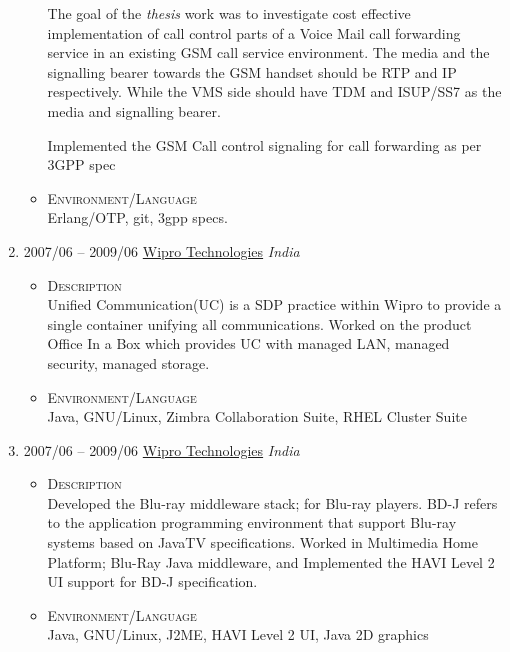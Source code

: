 \documentclass[a4paper,10pt]{article}
\begin{document}
\begin{enumerate}
\begin{itemize}
  The goal of the \emph{thesis} work was to investigate cost effective implementation of call control parts of a Voice Mail call forwarding service in an existing GSM call service environment. The media and the signalling bearer towards the GSM handset should be RTP and IP respectively. While the VMS side should have TDM and ISUP/SS7 as the media and signalling bearer.

  Implemented the GSM Call control signaling for call forwarding as per 3GPP spec

  \item \textsc{Environment/Language} \\
  Erlang/OTP, git, 3gpp specs.

   \end{itemize}

\item \textsc{2007/06} – \textsc{2009/06} \href{www.wipro.com}{Wipro Technologies} \emph {India} \\
  \begin{itemize}
    \item \textsc{Description} \\

      Unified Communication(UC) is a SDP practice within Wipro to provide a single container unifying all communications.
      Worked on the product Office In a Box which provides UC with managed LAN, managed security, managed storage.

    \item \textsc{Environment/Language} \\  
      Java, GNU/Linux, Zimbra Collaboration Suite, RHEL Cluster Suite

  \end{itemize}

\item \textsc{2007/06} – \textsc{2009/06} \href{www.wipro.com}{Wipro Technologies} \emph {India} \\

  \begin{itemize}
    \item \textsc{Description} \\
      Developed the Blu-ray middleware stack; for Blu-ray players. BD-J refers to the application programming environment that support Blu-ray systems based on JavaTV specifications. Worked in Multimedia Home Platform; Blu-Ray Java middleware, and Implemented the HAVI Level 2 UI support for BD-J specification.

    \item \textsc{Environment/Language} \\  
      Java, GNU/Linux, J2ME, HAVI Level 2 UI, Java 2D graphics


\end{itemize}
\end{enumerate}
\end{document}
